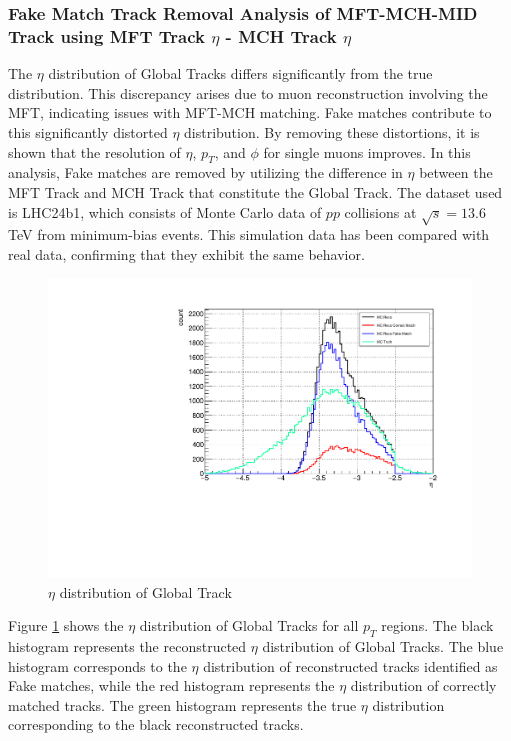         \subsubsection{Fake Match Track Removal Analysis of MFT-MCH-MID Track using MFT Track $\eta$ - MCH Track $\eta$}
        \label{Analysis:Matching}
            The \(\eta\) distribution of Global Tracks differs significantly from the true distribution. This discrepancy arises due to muon reconstruction involving the MFT, indicating issues with MFT-MCH matching. Fake matches contribute to this significantly distorted \(\eta\) distribution. By removing these distortions, it is shown that the resolution of \(\eta\), \(p_T\), and \(\phi\) for single muons improves. In this analysis, Fake matches are removed by utilizing the difference in \(\eta\) between the MFT Track and MCH Track that constitute the Global Track. The dataset used is LHC24b1, which consists of Monte Carlo data of \(pp\) collisions at \(\sqrt{s} = 13.6\) TeV from minimum-bias events. This simulation data has been compared with real data, confirming that they exhibit the same behavior. %
            \begin{figure}[H]
                \centering
                \includegraphics[keepaspectratio, scale=0.5]{fig/3_5_6_etacutno_eta.pdf}
                \caption{$\eta$ distribution of Global Track}
                \label{Analysis:Matching:eta}
            \end{figure}
            Figure \ref{Analysis:Matching:eta} shows the \(\eta\) distribution of Global Tracks for all \(p_T\) regions. The black histogram represents the reconstructed \(\eta\) distribution of Global Tracks. The blue histogram corresponds to the \(\eta\) distribution of reconstructed tracks identified as Fake matches, while the red histogram represents the \(\eta\) distribution of correctly matched tracks. The green histogram represents the true \(\eta\) distribution corresponding to the black reconstructed tracks.  
